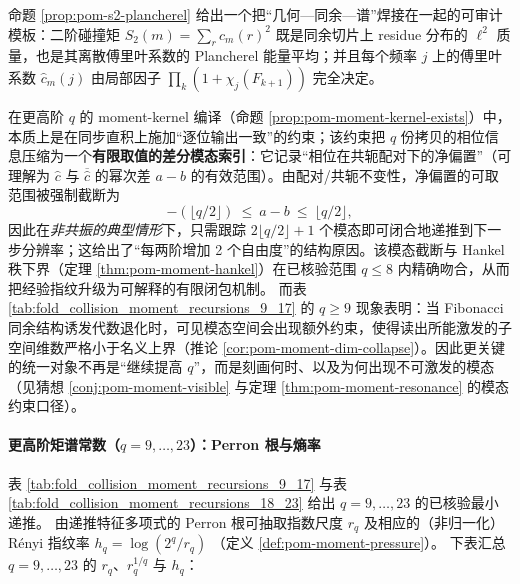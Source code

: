 \begin{remark}\label{rem:pom-closure-dim-mode-trunc}
命题 \ref{prop:pom-s2-plancherel} 给出一个把“几何—同余—谱”焊接在一起的可审计模板：二阶碰撞矩
\(
S_2(m)=\sum_r c_m(r)^2
\)
既是同余切片上 residue 分布的 \(\ell^2\) 质量，也是其离散傅里叶系数的 Plancherel 能量平均；并且每个频率 \(j\) 上的傅里叶系数 \(\widehat c_m(j)\) 由局部因子 \(\prod_k(1+\chi_j(F_{k+1}))\) 完全决定。

在更高阶 \(q\) 的 moment-kernel 编译（命题 \ref{prop:pom-moment-kernel-exists}）中，本质上是在同步直积上施加“逐位输出一致”的约束；该约束把 \(q\) 份拷贝的相位信息压缩为一个\textbf{有限取值的差分模态索引}：它记录“相位在共轭配对下的净偏置”（可理解为 \(\widehat c\) 与 \(\overline{\widehat c}\) 的幂次差 \(a-b\) 的有效范围）。由配对/共轭不变性，净偏置的可取范围被强制截断为
\[
-(\lfloor q/2\rfloor)\ \le\ a-b\ \le\ \lfloor q/2\rfloor,
\]
因此在\emph{非共振的典型情形}下，只需跟踪 \(2\lfloor q/2\rfloor+1\) 个模态即可闭合地递推到下一步分辨率；这给出了“每两阶增加 2 个自由度”的结构原因。该模态截断与 Hankel 秩下界（定理 \ref{thm:pom-moment-hankel}）在已核验范围 \(q\le 8\) 内精确吻合，从而把经验指纹升级为可解释的有限闭包机制。
而表 \ref{tab:fold_collision_moment_recursions_9_17} 的 \(q\ge 9\) 现象表明：当 Fibonacci 同余结构诱发代数退化时，可见模态空间会出现额外约束，使得读出所能激发的子空间维数严格小于名义上界（推论 \ref{cor:pom-moment-dim-collapse}）。因此更关键的统一对象不再是“继续提高 \(q\)”，而是刻画何时、以及为何出现不可激发的模态（见猜想 \ref{conj:pom-moment-visible} 与定理 \ref{thm:pom-moment-resonance} 的模态约束口径）。
\end{remark}









\paragraph{更高阶矩谱常数（\texorpdfstring{$q=9,\dots,23$}{q=9..23}）：Perron 根与熵率}
表 \ref{tab:fold_collision_moment_recursions_9_17} 与表 \ref{tab:fold_collision_moment_recursions_18_23} 给出 \(q=9,\dots,23\) 的已核验最小递推。
由递推特征多项式的 Perron 根可抽取指数尺度 \(r_q\) 及相应的（非归一化）Rényi 指纹率
\(
h_q=\log(2^q/r_q)
\)
（定义 \ref{def:pom-moment-pressure}）。
下表汇总 \(q=9,\dots,23\) 的 \(r_q\)、\(r_q^{1/q}\) 与 \(h_q\)：



